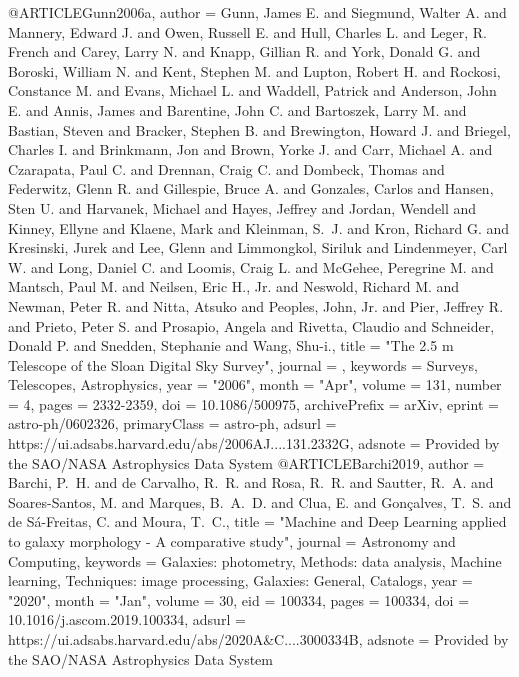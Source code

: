 @ARTICLE{Gunn2006a,
       author = {{Gunn}, James E. and {Siegmund}, Walter A. and {Mannery}, Edward J. and
         {Owen}, Russell E. and {Hull}, Charles L. and {Leger}, R. French and
         {Carey}, Larry N. and {Knapp}, Gillian R. and {York}, Donald G. and
         {Boroski}, William N. and {Kent}, Stephen M. and {Lupton}, Robert H. and
         {Rockosi}, Constance M. and {Evans}, Michael L. and {Waddell}, Patrick and
         {Anderson}, John E. and {Annis}, James and {Barentine}, John C. and
         {Bartoszek}, Larry M. and {Bastian}, Steven and {Bracker}, Stephen B. and
         {Brewington}, Howard J. and {Briegel}, Charles I. and {Brinkmann}, Jon and
         {Brown}, Yorke J. and {Carr}, Michael A. and {Czarapata}, Paul C. and
         {Drennan}, Craig C. and {Dombeck}, Thomas and {Federwitz}, Glenn R. and
         {Gillespie}, Bruce A. and {Gonzales}, Carlos and {Hansen}, Sten U. and
         {Harvanek}, Michael and {Hayes}, Jeffrey and {Jordan}, Wendell and
         {Kinney}, Ellyne and {Klaene}, Mark and {Kleinman}, S.~J. and
         {Kron}, Richard G. and {Kresinski}, Jurek and {Lee}, Glenn and
         {Limmongkol}, Siriluk and {Lindenmeyer}, Carl W. and {Long}, Daniel C. and
         {Loomis}, Craig L. and {McGehee}, Peregrine M. and {Mantsch}, Paul M. and
         {Neilsen}, Eric H., Jr. and {Neswold}, Richard M. and
         {Newman}, Peter R. and {Nitta}, Atsuko and {Peoples}, John, Jr. and
         {Pier}, Jeffrey R. and {Prieto}, Peter S. and {Prosapio}, Angela and
         {Rivetta}, Claudio and {Schneider}, Donald P. and {Snedden}, Stephanie and
         {Wang}, Shu-i.},
        title = "{The 2.5 m Telescope of the Sloan Digital Sky Survey}",
      journal = {\aj},
     keywords = {Surveys, Telescopes, Astrophysics},
         year = "2006",
        month = "Apr",
       volume = {131},
       number = {4},
        pages = {2332-2359},
          doi = {10.1086/500975},
archivePrefix = {arXiv},
       eprint = {astro-ph/0602326},
 primaryClass = {astro-ph},
       adsurl = {https://ui.adsabs.harvard.edu/abs/2006AJ....131.2332G},
      adsnote = {Provided by the SAO/NASA Astrophysics Data System}
}
@ARTICLE{Barchi2019,
       author = {{Barchi}, P.~H. and {de Carvalho}, R.~R. and {Rosa}, R.~R. and
         {Sautter}, R.~A. and {Soares-Santos}, M. and {Marques}, B.~A.~D. and
         {Clua}, E. and {Gon{\c{c}}alves}, T.~S. and {de S{\'a}-Freitas}, C. and
         {Moura}, T.~C.},
        title = "{Machine and Deep Learning applied to galaxy morphology - A comparative study}",
      journal = {Astronomy and Computing},
     keywords = {Galaxies: photometry, Methods: data analysis, Machine learning, Techniques: image processing, Galaxies: General, Catalogs},
         year = "2020",
        month = "Jan",
       volume = {30},
          eid = {100334},
        pages = {100334},
          doi = {10.1016/j.ascom.2019.100334},
       adsurl = {https://ui.adsabs.harvard.edu/abs/2020A&C....3000334B},
      adsnote = {Provided by the SAO/NASA Astrophysics Data System}
}
